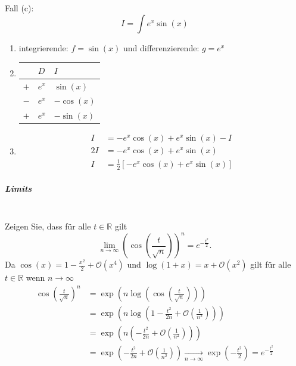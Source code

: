 \documentclass[7pt,landscape, margin = 0.1mm]{article}
\begin{document}
\begin{multicols}{4}
\begin{flushleft}
\begin{enumerate}
\end{enumerate}
Fall (c):\\
$$I= \int e^x \sin(x) $$
\begin{enumerate}
\item integrierende: $f=\sin(x)$ und differenzierende: $g=e^x$
\item 
\begin{center}

\begin{tabular}{l|ll}
    & $D$ & $I$ \\ \hline
$+$   & $e^x$   & $\sin(x)$   \\
$-$   &  $e^x$ &  $-\cos(x)$ \\ 
$+$   & $e^x$  &   $- \sin(x)$ \\ 

\end{tabular}
\end{center}
\item \begin{align*}
I &= -e^{x} \cos(x) + e^x \sin(x) - I \\  2 I &= -e^{x} \cos(x) + e^x \sin(x)\\
I &= \frac{1}{2} \left[ -e^{x} \cos(x) + e^x \sin(x)\right]
\end{align*}
\end{enumerate}

\vspace{1mm} \hline \vspace{1mm}
\subparagraph{Limits }\\
Zeigen Sie, dass für alle $t \in \mathbb{R}$ gilt
$$
\lim _{n \rightarrow \infty}\left(\cos \left(\frac{t}{\sqrt{n}}\right)\right)^n=e^{-\frac{t^2}{2}} .
$$
Da $\cos (x)=1-\frac{x^2}{2}+\mathcal{O}\left(x^4\right)$ und $\log (1+x)=x+\mathcal{O}\left(x^2\right)$ gilt für alle $t \in \mathbb{R}$ wenn $n \rightarrow \infty$
$$
\begin{aligned}
\cos \left(\frac{t}{\sqrt{n}}\right)^n & =\exp \left(n \log \left(\cos \left(\frac{t}{\sqrt{n}}\right)\right)\right) \\
& =\exp \left(n \log \left(1-\frac{t^2}{2 n}+\mathcal{O}\left(\frac{1}{n^2}\right)\right)\right) \\
& =\exp \left(n\left(-\frac{t^2}{2 n}+\mathcal{O}\left(\frac{1}{n^2}\right)\right)\right) \\
& =\exp \left(-\frac{t^2}{2 n}+\mathcal{O}\left(\frac{1}{n^2}\right)\right) \underset{n \rightarrow \infty}{\longrightarrow} \exp \left(-\frac{t^2}{2}\right)=e^{-\frac{t^2}{2}}
\end{aligned}
$$


\end{flushleft}
\end{multicols}
\end{document}
